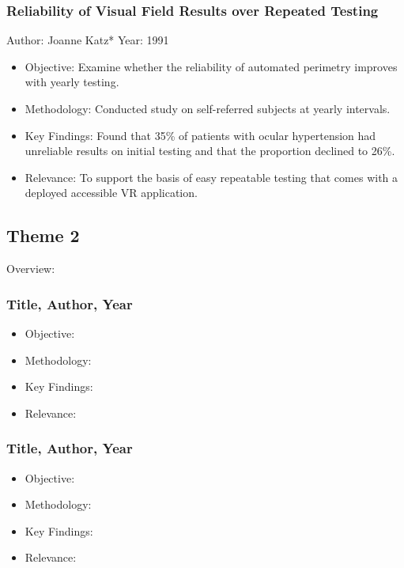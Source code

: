\documentclass[11pt]{article}
\begin{document}
        \subsubsection{Reliability of Visual Field Results over Repeated                    Testing}
            Author: Joanne Katz*
            Year: 1991  
            \begin{itemize}
                \item Objective: Examine whether the reliability of automated perimetry improves with yearly testing.
                \item Methodology: Conducted study on self-referred subjects at yearly intervals.
                \item Key Findings: Found that 35\% of patients
                with ocular hypertension had unreliable results on initial testing and that the proportion declined to 26\%.
                \item Relevance: To support the basis of easy repeatable testing that comes with a deployed accessible VR application.
            \end{itemize}

\newpage
\subsection{Theme 2}
    Overview: 
        \subsubsection{Title, Author, Year}
            \begin{itemize}
                \item Objective:
                \item Methodology:
                \item Key Findings:
                \item Relevance:
            \end{itemize}

        \subsubsection{Title, Author, Year}
            \begin{itemize}
                \item Objective:
                \item Methodology:
                \item Key Findings:
                \item Relevance:
            \end{itemize}
\end{document}

